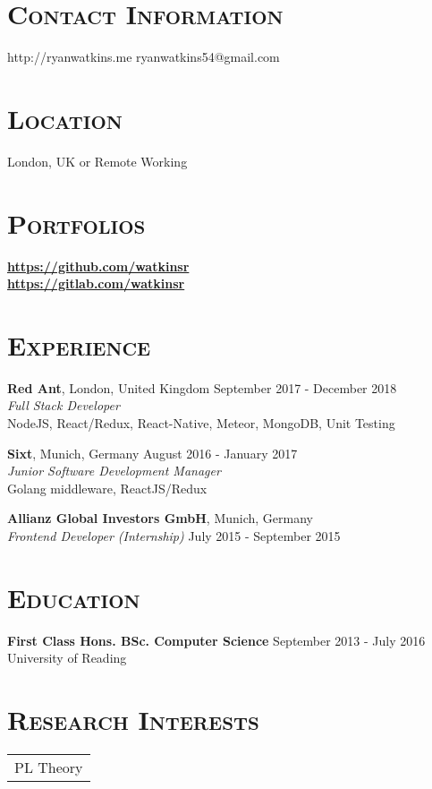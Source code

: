\documentclass[line, margin, 10pt]{res}
\begin{document}
\renewcommand{\namefont}{ \LARGE \bf }


\begin{resume}

\section{\textsc{Contact Information}}
http://ryanwatkins.me \hfill {ryanwatkins54@gmail.com}\\

\section{\textsc{Location}}
London, UK or Remote Working

\section{\textsc{Portfolios}}
        {\bf \url{https://github.com/watkinsr}}\\
        {\hfill {\bf \url{https://gitlab.com/watkinsr}}}

\section{\textsc{Experience}}

{\bf Red Ant}, London, United Kingdom {\hfill September 2017 -  December 2018}\\
{\it Full Stack Developer} \\
NodeJS, React/Redux, React-Native, Meteor, MongoDB, Unit Testing

{\bf Sixt}, Munich, Germany {\hfill August 2016 - January 2017}\\
{\it Junior Software Development Manager} \\
Golang middleware, ReactJS/Redux

{\bf Allianz Global Investors GmbH}, Munich, Germany\\
{\it Frontend Developer (Internship)} {\hfill July 2015 - September 2015}

\section{\textsc{Education}}
{\bf First Class Hons. BSc. Computer Science}  {\hfill September 2013 - July 2016}\\
University of Reading

\section{\textsc{Research Interests}}
\begin{tabular}[t]{@{} p{6.0 in}  @{}}
  PL Theory\\
\end{tabular}


\end{resume}
\end{document}
